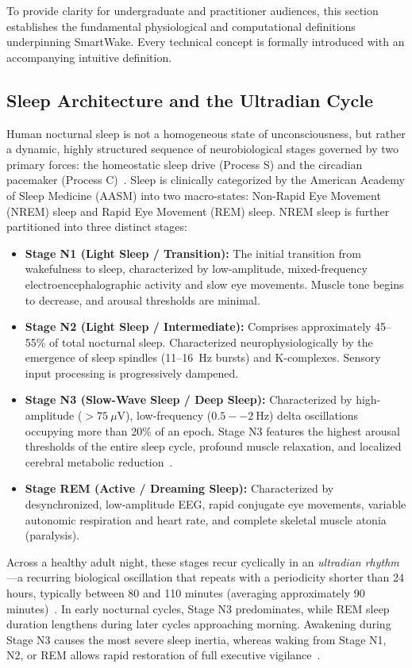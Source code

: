 \documentclass[journal,11pt,onecolumn]{IEEEtran}
\begin{document}
To provide clarity for undergraduate and practitioner audiences, this section establishes the fundamental physiological and computational definitions underpinning SmartWake. Every technical concept is formally introduced with an accompanying intuitive definition.

\subsection{Sleep Architecture and the Ultradian Cycle}
Human nocturnal sleep is not a homogeneous state of unconsciousness, but rather a dynamic, highly structured sequence of neurobiological stages governed by two primary forces: the homeostatic sleep drive (Process S) and the circadian pacemaker (Process C)~\cite{carskadon2011normal, roenneberg2003life}. Sleep is clinically categorized by the American Academy of Sleep Medicine (AASM) into two macro-states: Non-Rapid Eye Movement (NREM) sleep and Rapid Eye Movement (REM) sleep. NREM sleep is further partitioned into three distinct stages:
\begin{itemize}[leftmargin=*]
    \item \textbf{Stage N1 (Light Sleep / Transition):} The initial transition from wakefulness to sleep, characterized by low-amplitude, mixed-frequency electroencephalographic activity and slow eye movements. Muscle tone begins to decrease, and arousal thresholds are minimal.
    \item \textbf{Stage N2 (Light Sleep / Intermediate):} Comprises approximately 45--55\% of total nocturnal sleep. Characterized neurophysiologically by the emergence of sleep spindles (11--16~Hz bursts) and K-complexes. Sensory input processing is progressively dampened.
    \item \textbf{Stage N3 (Slow-Wave Sleep / Deep Sleep):} Characterized by high-amplitude ($>75~\mu\text{V}$), low-frequency ($0.5--2~\text{Hz}$) delta oscillations occupying more than 20\% of an epoch. Stage N3 features the highest arousal thresholds of the entire sleep cycle, profound muscle relaxation, and localized cerebral metabolic reduction~\cite{carskadon2011normal}.
    \item \textbf{Stage REM (Active / Dreaming Sleep):} Characterized by desynchronized, low-amplitude EEG, rapid conjugate eye movements, variable autonomic respiration and heart rate, and complete skeletal muscle atonia (paralysis).
\end{itemize}

Across a healthy adult night, these stages recur cyclically in an \textit{ultradian rhythm}---a recurring biological oscillation that repeats with a periodicity shorter than 24 hours, typically between 80 and 110 minutes (averaging approximately 90 minutes)~\cite{carskadon2011normal}. In early nocturnal cycles, Stage N3 predominates, while REM sleep duration lengthens during later cycles approaching morning. Awakening during Stage N3 causes the most severe sleep inertia, whereas waking from Stage N1, N2, or REM allows rapid restoration of full executive vigilance~\cite{tassi2000sleep, wertz2006effects}.
\end{document}
